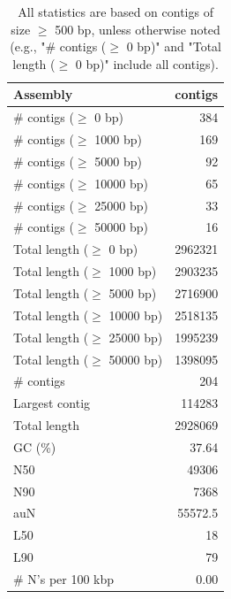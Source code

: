 \documentclass[12pt,a4paper]{article}
\begin{document}
\begin{table}[ht]
\begin{center}
\caption{All statistics are based on contigs of size $\geq$ 500 bp, unless otherwise noted (e.g., "\# contigs ($\geq$ 0 bp)" and "Total length ($\geq$ 0 bp)" include all contigs).}
\begin{tabular}{|l*{1}{|r}|}
\hline
Assembly & contigs \\ \hline
\# contigs ($\geq$ 0 bp) & 384 \\ \hline
\# contigs ($\geq$ 1000 bp) & 169 \\ \hline
\# contigs ($\geq$ 5000 bp) & 92 \\ \hline
\# contigs ($\geq$ 10000 bp) & 65 \\ \hline
\# contigs ($\geq$ 25000 bp) & 33 \\ \hline
\# contigs ($\geq$ 50000 bp) & 16 \\ \hline
Total length ($\geq$ 0 bp) & 2962321 \\ \hline
Total length ($\geq$ 1000 bp) & 2903235 \\ \hline
Total length ($\geq$ 5000 bp) & 2716900 \\ \hline
Total length ($\geq$ 10000 bp) & 2518135 \\ \hline
Total length ($\geq$ 25000 bp) & 1995239 \\ \hline
Total length ($\geq$ 50000 bp) & 1398095 \\ \hline
\# contigs & 204 \\ \hline
Largest contig & 114283 \\ \hline
Total length & 2928069 \\ \hline
GC (\%) & 37.64 \\ \hline
N50 & 49306 \\ \hline
N90 & 7368 \\ \hline
auN & 55572.5 \\ \hline
L50 & 18 \\ \hline
L90 & 79 \\ \hline
\# N's per 100 kbp & 0.00 \\ \hline
\end{tabular}
\end{center}
\end{table}
\end{document}
